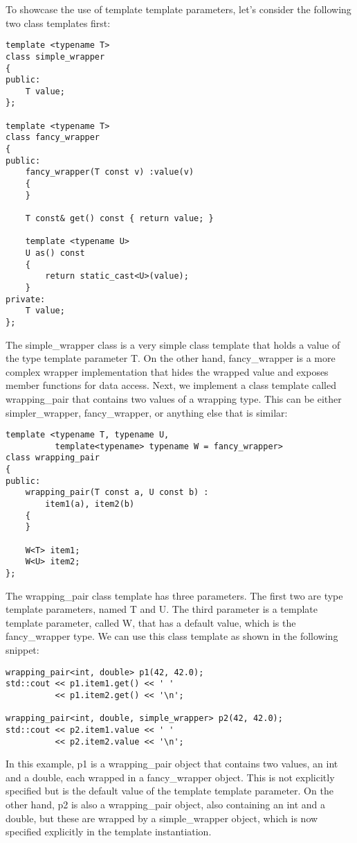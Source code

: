 To showcase the use of template template parameters, let's consider the following two class templates first:

\begin{lstlisting}[style=styleCXX]
template <typename T>
class simple_wrapper
{
public:
	T value;
};

template <typename T>
class fancy_wrapper
{
public:
	fancy_wrapper(T const v) :value(v)
	{
	}

	T const& get() const { return value; }
	
	template <typename U>
	U as() const
	{
		return static_cast<U>(value);
	}
private:
	T value;
};
\end{lstlisting}

The simple\_wrapper class is a very simple class template that holds a value of the type template parameter T. On the other hand, fancy\_wrapper is a more complex wrapper implementation that hides the wrapped value and exposes member functions for data access. Next, we implement a class template called wrapping\_pair that contains two values of a wrapping type. This can be either simpler\_wrapper, fancy\_wrapper, or anything else that is similar:

\begin{lstlisting}[style=styleCXX]
template <typename T, typename U,
		  template<typename> typename W = fancy_wrapper>
class wrapping_pair
{
public:
	wrapping_pair(T const a, U const b) :
		item1(a), item2(b)
	{
	}

	W<T> item1;
	W<U> item2;
};
\end{lstlisting}

The wrapping\_pair class template has three parameters. The first two are type template parameters, named T and U. The third parameter is a template template parameter, called W, that has a default value, which is the fancy\_wrapper type. We can use this class template as shown in the following snippet:

\begin{lstlisting}[style=styleCXX]
wrapping_pair<int, double> p1(42, 42.0);
std::cout << p1.item1.get() << ' '
		  << p1.item2.get() << '\n';

wrapping_pair<int, double, simple_wrapper> p2(42, 42.0);
std::cout << p2.item1.value << ' '
		  << p2.item2.value << '\n';
\end{lstlisting}

In this example, p1 is a wrapping\_pair object that contains two values, an int and a double, each wrapped in a fancy\_wrapper object. This is not explicitly specified but is the default value of the template template parameter. On the other hand, p2 is also a wrapping\_pair object, also containing an int and a double, but these are wrapped by a simple\_wrapper object, which is now specified explicitly in the template instantiation.

